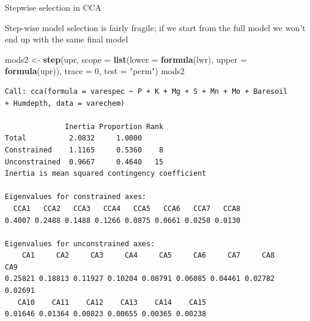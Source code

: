 \documentclass[10pt,ignorenonframetext,compress, aspectratio=169]{beamer}
\newenvironment{Shaded}{\begin{snugshade}}{\end{snugshade}}
\newcommand{\KeywordTok}[1]{\textcolor[rgb]{0.13,0.29,0.53}{\textbf{{#1}}}}
\newcommand{\DataTypeTok}[1]{\textcolor[rgb]{0.13,0.29,0.53}{{#1}}}
\newcommand{\DecValTok}[1]{\textcolor[rgb]{0.00,0.00,0.81}{{#1}}}
\newcommand{\StringTok}[1]{\textcolor[rgb]{0.31,0.60,0.02}{{#1}}}
\newcommand{\NormalTok}[1]{{#1}}
\begin{document}
\begin{frame}[fragile]{Stepwise selection in CCA}

Step-wise model selection is fairly fragile; if we start from the full
model we won't end up with the same final model

\tiny

\begin{Shaded}
\begin{Highlighting}[]
\NormalTok{mods2 <-}\StringTok{ }\KeywordTok{step}\NormalTok{(upr, }\DataTypeTok{scope =} \KeywordTok{list}\NormalTok{(}\DataTypeTok{lower =} \KeywordTok{formula}\NormalTok{(lwr), }\DataTypeTok{upper =} \KeywordTok{formula}\NormalTok{(upr)), }\DataTypeTok{trace =} \DecValTok{0}\NormalTok{,}
              \DataTypeTok{test =} \StringTok{"perm"}\NormalTok{)}
\NormalTok{mods2}
\end{Highlighting}
\end{Shaded}

\begin{verbatim}
Call: cca(formula = varespec ~ P + K + Mg + S + Mn + Mo + Baresoil
+ Humdepth, data = varechem)

              Inertia Proportion Rank
Total          2.0832     1.0000     
Constrained    1.1165     0.5360    8
Unconstrained  0.9667     0.4640   15
Inertia is mean squared contingency coefficient 

Eigenvalues for constrained axes:
  CCA1   CCA2   CCA3   CCA4   CCA5   CCA6   CCA7   CCA8 
0.4007 0.2488 0.1488 0.1266 0.0875 0.0661 0.0250 0.0130 

Eigenvalues for unconstrained axes:
    CA1     CA2     CA3     CA4     CA5     CA6     CA7     CA8     CA9 
0.25821 0.18813 0.11927 0.10204 0.08791 0.06085 0.04461 0.02782 0.02691 
   CA10    CA11    CA12    CA13    CA14    CA15 
0.01646 0.01364 0.00823 0.00655 0.00365 0.00238 
\end{verbatim}

\normalsize

\end{frame}
\end{document}

